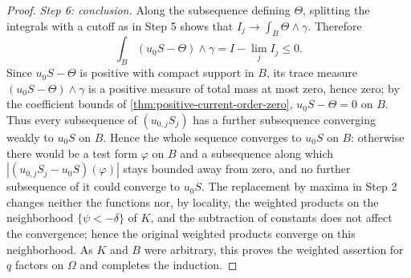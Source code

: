 \begin{proof}
\emph{Step 6: conclusion.} Along the subsequence defining $\Theta$, splitting the integrals with a cutoff as in Step 5 shows that $I_j\to\int_B\Theta\wedge\gamma$. Therefore
\[
 \int_B(u_0S-\Theta)\wedge\gamma=I-\lim_jI_j\le0.
\]
Since $u_0S-\Theta$ is positive with compact support in $B$, its trace measure $(u_0S-\Theta)\wedge\gamma$ is a positive measure of total mass at most zero, hence zero; by the coefficient bounds of \cref{thm:positive-current-order-zero}, $u_0S-\Theta=0$ on $B$. Thus every subsequence of $(u_{0,j}S_j)$ has a further subsequence converging weakly to $u_0S$ on $B$. Hence the whole sequence converges to $u_0S$ on $B$: otherwise there would be a test form $\varphi$ on $B$ and a subsequence along which $|(u_{0,j}S_j-u_0S)(\varphi)|$ stays bounded away from zero, and no further subsequence of it could converge to $u_0S$. The replacement by maxima in Step 2 changes neither the functions nor, by locality, the weighted products on the neighborhood $\{\psi<-\delta\}$ of $K$, and the subtraction of constants does not affect the convergence; hence the original weighted products converge on this neighborhood. As $K$ and $B$ were arbitrary, this proves the weighted assertion for $q$ factors on $\Omega$ and completes the induction.
\end{proof}

